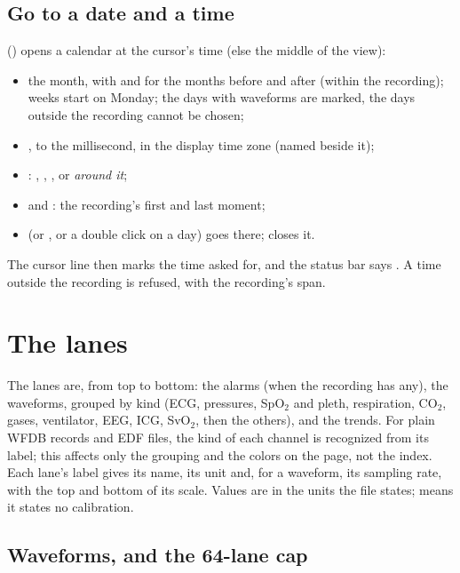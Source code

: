 \subsection{Go to a date and a time}
\label{sec:vitalstream-goto}

 () opens a calendar at the cursor's time (else the middle of the view):
\begin{itemize}
\item the month, with \ui{\textless} and \ui{\textgreater} for the months before and after (within
  the recording); weeks start on Monday; the days with waveforms are marked, the days outside the
  recording cannot be chosen;
\item {}, to the millisecond, in the display time zone (named beside it);
\item {}: , , ,  or 
  \emph{around it};
\item {} and : the recording's first and last moment;
\item {} (or , or a double click on a day) goes there;  closes it.
\end{itemize}
The cursor line then marks the time asked for, and the status bar says . A
time outside the recording is refused, with the recording's span.

\section{The lanes}
\label{sec:vitalstream-lanes}

The lanes are, from top to bottom: the alarms (when the recording has any), the waveforms,
grouped by kind (ECG, pressures, SpO$_2$ and pleth, respiration, CO$_2$, gases, ventilator, EEG,
ICG, SvO$_2$, then the others), and the trends. For plain WFDB records and EDF files, the kind of
each channel is recognized from its label; this affects only the grouping and the colors on the
page, not the index. Each lane's label gives its name, its unit and,
for a waveform, its sampling rate, with the top and bottom of its scale. Values are in the
units the file states;  means it states no calibration.

\subsection{Waveforms, and the 64-lane cap}
\label{sec:vitalstream-waves}

